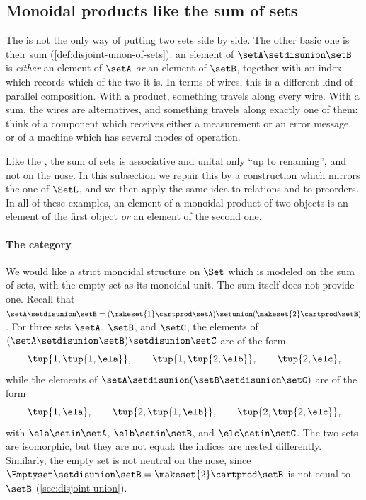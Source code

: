 \subsection{Monoidal products like the sum of sets}
\label{sec:strict-monoidal-sums}

The  is not the only way of putting two sets side by side.
The other basic one is their sum (\cref{def:disjoint-union-of-sets}): an element of $\setA \setdisunion \setB$ is \emph{either} an element of $\setA$ \emph{or} an element of $\setB$, together with an index which records which of the two it is.
In terms of wires, this is a different kind of parallel composition.
With a product, something travels along every wire.
With a sum, the wires are alternatives, and something travels along exactly one of them: think of a component which receives either a measurement or an error message, or of a machine which has several modes of operation.

Like the , the sum of sets is associative and unital only ``up to renaming'', and not on the nose.
In this subsection we repair this by a construction which mirrors the one of $\SetL$, and we then apply the same idea to relations and to preorders.
In all of these examples, an element of a monoidal product of two objects is an element of the first object \emph{or} an element of the second one.

\paragraph{The category \SetR}
\label{sec:cocartcatset}

We would like a strict monoidal structure on $\Set$ which is modeled on the sum of sets, with the empty set as its monoidal unit.
The sum itself does not provide one.
Recall that $\setA \setdisunion \setB = (\makeset{1} \cartprod \setA) \setunion (\makeset{2} \cartprod \setB)$.
For three sets $\setA$, $\setB$, and $\setC$, the elements of $(\setA \setdisunion \setB) \setdisunion \setC$ are of the form
\begin{equation}
    \label{eq:sum-assoc-fails-1}
    \tup{1, \tup{1, \ela}}, \qquad \tup{1, \tup{2, \elb}}, \qquad \tup{2, \elc},
\end{equation}
while the elements of $\setA \setdisunion (\setB \setdisunion \setC)$ are of the form
\begin{equation}
    \label{eq:sum-assoc-fails-2}
    \tup{1, \ela}, \qquad \tup{2, \tup{1, \elb}}, \qquad \tup{2, \tup{2, \elc}},
\end{equation}
with $\ela \setin \setA$, $\elb \setin \setB$, and $\elc \setin \setC$.
The two sets are isomorphic, but they are not equal: the indices are nested differently.
Similarly, the empty set is not neutral on the nose, since $\Emptyset \setdisunion \setB = \makeset{2} \cartprod \setB$ is not equal to $\setB$ (\cref{sec:disjoint-union}).

